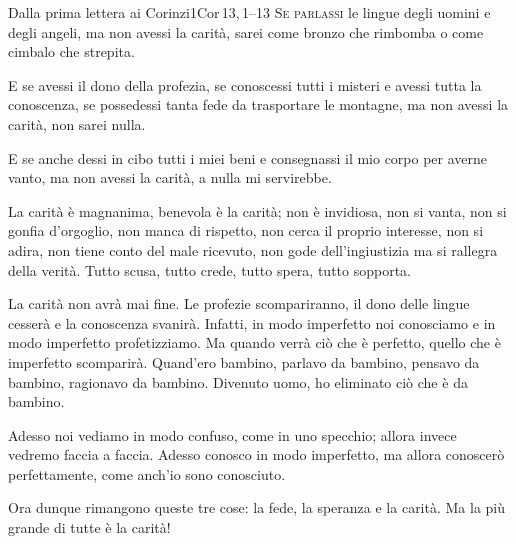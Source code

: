 \documentclass[11pt]{book}
\begin{document}
\begin{lettura}{Dalla prima lettera ai Corinzi}{1Cor\,13,\,1--13}
\lettrine[lines=3]{S}{e parlassi} le lingue degli uomini e degli angeli, ma non avessi la carità, sarei come bronzo che rimbomba o come cimbalo che strepita.

E se avessi il dono della profezia, se conoscessi tutti i misteri e avessi tutta la conoscenza, se possedessi tanta fede da trasportare le montagne, ma non avessi la carità, non sarei nulla.

E se anche dessi in cibo tutti i miei beni e consegnassi il mio corpo per averne vanto, ma non avessi la carità, a nulla mi servirebbe.

La carità è magnanima, benevola è la carità; non è invidiosa, non si vanta, non si gonfia d'orgoglio, non manca di rispetto, non cerca il proprio interesse, non si adira, non tiene conto del male ricevuto, non gode dell'ingiustizia ma si rallegra della verità. Tutto scusa, tutto crede, tutto spera, tutto sopporta.

La carità non avrà mai fine. Le profezie scompariranno, il dono delle lingue cesserà e la conoscenza svanirà. Infatti, in modo imperfetto noi conosciamo e in modo imperfetto profetizziamo. Ma quando verrà ciò che è perfetto, quello che è imperfetto scomparirà. Quand'ero bambino, parlavo da bambino, pensavo da bambino, ragionavo da bambino. Divenuto uomo, ho eliminato ciò che è da bambino.

Adesso noi vediamo in modo confuso, come in uno specchio; allora invece vedremo faccia a faccia. Adesso conosco in modo imperfetto, ma allora conoscerò perfettamente, come anch'io sono conosciuto. 

Ora dunque rimangono queste tre cose: la fede, la speranza e la carità. Ma la più grande di tutte è la carità!
\end{lettura}
\end{document}
